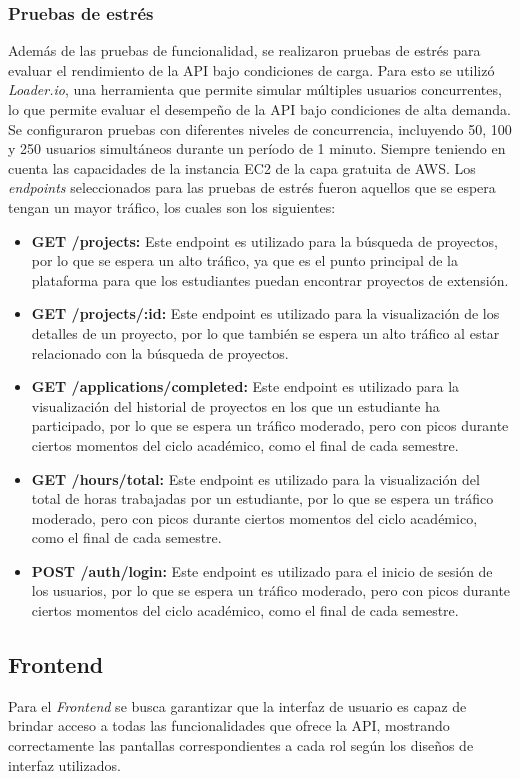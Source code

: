 \subsubsection{Pruebas de estrés}
Además de las pruebas de funcionalidad, se realizaron pruebas de estrés para evaluar el rendimiento de la API bajo condiciones de carga.
Para esto se utilizó \textit{Loader.io}, una herramienta que permite simular múltiples usuarios concurrentes, lo que permite evaluar
el desempeño de la API bajo condiciones de alta demanda.
Se configuraron pruebas con diferentes niveles de concurrencia, incluyendo 50, 100 y 250 usuarios simultáneos durante un período de
1 minuto. Siempre teniendo en cuenta las capacidades de la instancia EC2 de la capa gratuita de AWS.
Los \textit{endpoints} seleccionados para las pruebas de estrés fueron aquellos que se espera tengan un mayor tráfico, los cuales son
los siguientes:
\begin{itemize}
    \item \textbf{GET /projects:} Este endpoint es utilizado para la búsqueda de proyectos, por lo que se espera un alto tráfico, ya que
        es el punto principal de la plataforma para que los estudiantes puedan encontrar proyectos de extensión.
    \item \textbf{GET /projects/:id:} Este endpoint es utilizado para la visualización de los detalles de un proyecto, por lo que también
        se espera un alto tráfico al estar relacionado con la búsqueda de proyectos.
    \item \textbf{GET /applications/completed:} Este endpoint es utilizado para la visualización del historial de proyectos en los que
        un estudiante ha participado, por lo que se espera un tráfico moderado, pero con picos durante ciertos momentos del ciclo académico,
        como el final de cada semestre.
    \item \textbf{GET /hours/total:} Este endpoint es utilizado para la visualización del total de horas trabajadas por un estudiante,
        por lo que se espera un tráfico moderado, pero con picos durante ciertos momentos del ciclo académico, como el final de cada semestre.
    \item \textbf{POST /auth/login:} Este endpoint es utilizado para el inicio de sesión de los usuarios, por lo que se espera un tráfico
        moderado, pero con picos durante ciertos momentos del ciclo académico, como el final de cada semestre.
\end{itemize}

\subsection{Frontend}
Para el \textit{Frontend} se busca garantizar que la interfaz de usuario es capaz de brindar acceso a todas las funcionalidades que ofrece la
API, mostrando correctamente las pantallas correspondientes a cada rol según los diseños de interfaz utilizados. 

